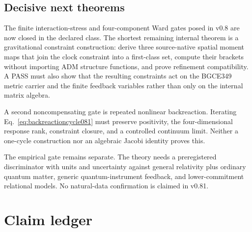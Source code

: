 \documentclass[11pt]{article}
\theoremstyle{definition}
\theoremstyle{remark}
\begin{document}
\subsection{Decisive next theorems}

The finite interaction-stress and four-component Ward gates posed in v0.8 are now closed in the declared class. The shortest remaining internal theorem is a gravitational constraint construction: derive three source-native spatial moment maps that join the clock constraint into a first-class set, compute their brackets without importing ADM structure functions, and prove refinement compatibility. A PASS must also show that the resulting constraints act on the BGCE349 metric carrier and the finite feedback variables rather than only on the internal matrix algebra.

A second noncompensating gate is repeated nonlinear backreaction. Iterating Eq.~\eqref{eq:backreactioncycle081} must preserve positivity, the four-dimensional response rank, constraint closure, and a controlled continuum limit. Neither a one-cycle construction nor an algebraic Jacobi identity proves this.

The empirical gate remains separate. The theory needs a preregistered discriminator with units and uncertainty against general relativity plus ordinary quantum matter, generic quantum-instrument feedback, and lower-commitment relational models. No natural-data confirmation is claimed in v0.81.

\section{Claim ledger}
\end{document}
